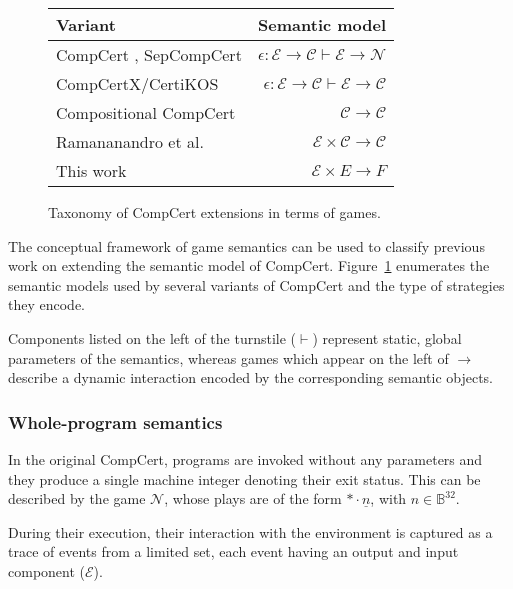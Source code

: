 \documentclass[sigplan,10pt,review,anonymous]{acmart}
\begin{document}
\begin{figure} %
  \begin{tabular}{lr}
    \hline
    Variant & Semantic model \\
    \hline
    CompCert \cite{compcert}, SepCompCert \cite{sepcompcert} &
      $\epsilon : \mathcal{E} \rightarrow \mathcal{C} \vdash
       \mathcal{E} \rightarrow \mathcal{N}$ \\
    CompCertX/CertiKOS \cite{popl15} &
      $\epsilon : \mathcal{E} \rightarrow \mathcal{C} \vdash
       \mathcal{E} \rightarrow \mathcal{C}$ \\
    Compositional CompCert \cite{compcompcert} &
      $\mathcal{C} \rightarrow \mathcal{C}$ \\
    Ramananandro et al. \cite{cpp15} &
      $\mathcal{E} \times \mathcal{C} \rightarrow \mathcal{C}$ \\
    This work &
      $\mathcal{E} \times E \rightarrow F$ \\
    \hline
  \end{tabular}
  \caption{Taxonomy of CompCert extensions in terms of games.}
  \label{fig:compcerts}
\end{figure}

The conceptual framework of game semantics
can be used to classify previous work
on extending the semantic model of CompCert.
Figure~\ref{fig:compcerts}
enumerates the semantic models
used by several variants of CompCert
and the type of strategies they encode.

Components listed on the left of the turnstile ($\vdash$)
represent static, global parameters of the semantics,
whereas games which appear on the left of $\rightarrow$
describe a dynamic interaction
encoded by the corresponding semantic objects.

\subsubsection{Whole-program semantics} %

In the original CompCert,
programs are invoked without any parameters
and they produce a single machine integer denoting their exit status.
This can be described by the game $\mathcal{N}$,
whose plays are of the form ${*} \cdot \underline{n}$,
with $n \in \mathbb{B}^{32}$.

During their execution,
their interaction with the environment
is captured as a trace of events from a limited set,
each event having an output and input component ($\mathcal{E}$).
\end{document}
